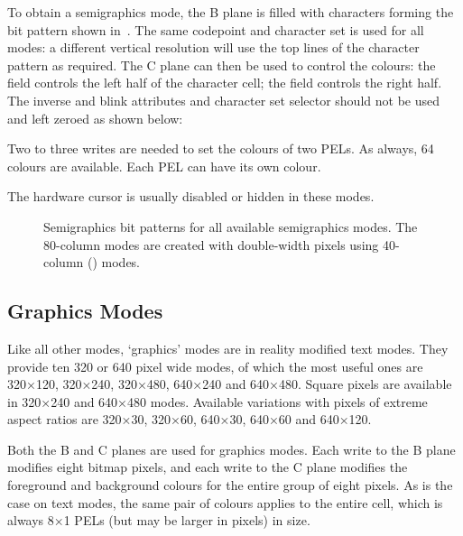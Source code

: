 To obtain a semigraphics mode, the B plane is filled with characters forming
the bit pattern shown in~. The same codepoint
and character set is used for all modes: a different vertical resolution will
use the top lines of the character pattern as required. The C plane can then be
used to control the colours: the  field controls the left
half of the character cell; the  field controls the right
half. The inverse and blink attributes and  character set selector
should not be used and left zeroed as shown below:

\begin{cbitfield}[8]
\end{cbitfield}

Two to three writes are needed to set the colours of two \glspl{PEL}. As always, 64
colours are available. Each PEL can have its own colour.

The hardware cursor is usually disabled or hidden in these modes.

\begin{figure}
 \centering
 
 \caption[Semigraphics bit patterns]{\label{fig:semigraphics-bit-pattern}
   Semigraphics bit patterns for all available semigraphics modes. The
   80-column modes are created with double-width pixels using 40-column
   () modes.}
\end{figure}


\subsection{Graphics Modes}

Like all other modes, ‘graphics’ modes are in reality modified text modes. They
provide ten 320 or 640 pixel wide modes, of which the most useful ones are
320×120, 320×240, 320×480, 640×240 and 640×480. Square pixels are available in
320×240 and 640×480 modes. Available variations with pixels of extreme aspect
ratios are 320×30, 320×60, 640×30, 640×60 and 640×120.

Both the B and C planes are used for graphics modes. Each write to the B plane
modifies eight bitmap pixels, and each write to the C plane modifies the
foreground and background colours for the entire group of eight pixels. As is
the case on text modes, the same pair of colours applies to the entire cell,
which is always 8×1 \glspl{PEL} (but may be larger in pixels) in size.

